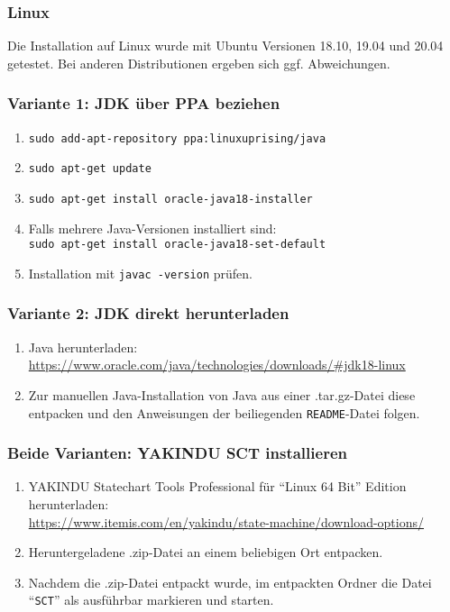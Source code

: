 \subsubsection{Linux}

Die Installation auf Linux wurde mit Ubuntu Versionen 18.10, 19.04 und 20.04 getestet. Bei anderen Distributionen ergeben sich ggf. Abweichungen.


\subsubsection*{Variante 1: JDK über PPA beziehen}
\begin{enumerate}
	\setlength\topsep{-1em}
	\setlength\itemsep{-0.5em}
	\item \texttt{sudo add-apt-repository ppa:linuxuprising/java}
	\item \texttt{sudo apt-get update}
	\item \texttt{sudo apt-get install oracle-java18-installer}
	\item Falls mehrere Java-Versionen installiert sind: \\\texttt{sudo apt-get install oracle-java18-set-default}
	\item Installation mit \texttt{javac -version} prüfen.
\end{enumerate}



\subsubsection*{Variante 2: JDK direkt herunterladen}
\begin{enumerate}
	\setlength\topsep{-1em}
	\setlength\itemsep{-0.5em}
	\item Java herunterladen:
	\\\url{https://www.oracle.com/java/technologies/downloads/#jdk18-linux}
	\item Zur manuellen Java-Installation von Java aus einer .tar.gz-Datei diese entpacken und den Anweisungen der beiliegenden \texttt{README}-Datei folgen.
\end{enumerate}


\subsubsection*{Beide Varianten: YAKINDU SCT installieren}
\begin{enumerate}
	\setlength\topsep{-1em}
	\setlength\itemsep{-0.5em}
	\item YAKINDU Statechart Tools Professional für \enquote{Linux 64 Bit} Edition herunterladen:
	\\\url{https://www.itemis.com/en/yakindu/state-machine/download-options/}
	\item Heruntergeladene .zip-Datei an einem beliebigen Ort entpacken.
	\item Nachdem die .zip-Datei entpackt wurde, im entpackten Ordner die Datei \enquote{\texttt{SCT}} als ausführbar markieren und starten.
\end{enumerate}




